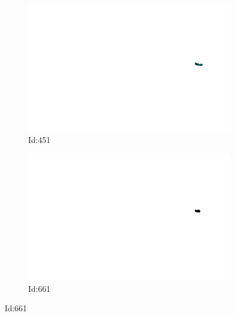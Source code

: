 \documentclass[12pt,twoside]{report}
\begin{document}
\begin{figure}
\centering
\begin{subfigure}[b]{0.20\textwidth}
\centering
\includegraphics[width=\textwidth]{../../trajectories/451.png}
\caption{Id:451}
\end{subfigure}
\begin{subfigure}[b]{0.20\textwidth}
\centering
\includegraphics[width=\textwidth]{../../trajectories/661.png}
\caption{Id:661}
\end{subfigure}
\end{figure}
\end{document}
